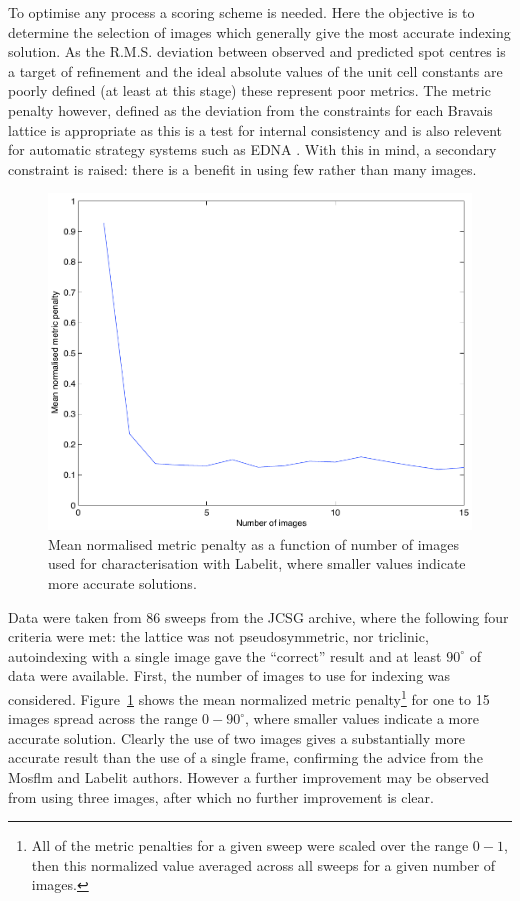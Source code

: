 \documentclass[preprint,pdf]{iucr}
\begin{document}
To optimise any process a scoring scheme is needed. Here the objective
is to determine the selection of images which generally give the most
accurate indexing solution. As the R.M.S. deviation between observed
and predicted spot centres is a target of refinement and the ideal absolute
values of the unit cell constants are poorly defined (at least at this
stage) these represent poor metrics. The metric penalty however,
defined as the deviation from the constraints for each Bravais lattice
\cite{Grosse-Kunstleve:sh5006} is appropriate as this is a test for
internal consistency 
and is also relevent for automatic strategy systems such as EDNA
\cite{Incardona:wa5014}. With this in mind, a secondary constraint is raised:
there is a benefit in using few rather than many images.

\begin{figure}
\caption{Mean normalised metric penalty as a function of number of
  images used for characterisation with Labelit, where smaller values
  indicate more accurate solutions.
\label{figure:no_images}}
\centering
\includegraphics[scale=0.5]{figures/no_images.pdf}
\end{figure}

Data were taken from 86 sweeps from the JCSG archive, where  the
following four
criteria were met: the lattice was not pseudosymmetric, nor triclinic,
autoindexing with a single image gave the ``correct'' result and at
least $90^{\circ}$ of data were available. First, the number of images
to use for indexing was considered. Figure~\ref{figure:no_images}
shows the mean 
normalized metric penalty\footnote{All of the metric penalties for a
  given sweep were scaled over the range $0 - 1$, then this normalized
  value averaged across all sweeps for a given number of images.} for
one to 15 images spread across the range $0 - 90^{\circ}$, where
smaller values indicate a more accurate solution. Clearly the use of
two images gives a substantially more accurate result than the use of
a single frame, confirming the advice from the Mosflm and
Labelit authors. However a further improvement may be observed from
using three images, after which no further improvement is clear. 
\end{document}
